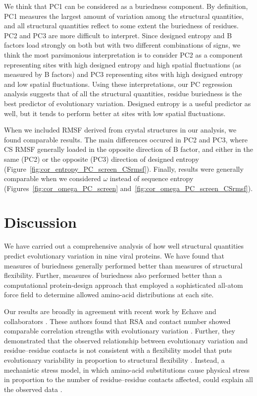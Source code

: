 \documentclass[12pt]{article}
\begin{document}
We think that PC1 can be considered as a buriedness component. By definition, PC1 measures the largest amount of variation among the structural quantities, and all structural quantities reflect to some extent the buriedness of residues. PC2 and PC3 are more difficult to interpret. Since designed entropy and B factors load strongly on both but with two different combinations of signs, we think the most parsimonious interpretation is to consider PC2 as a component representing sites with high designed entropy and high spatial fluctuations (as measured by B factors) and PC3 representing sites with high designed entropy and low spatial fluctuations. Using these interpretations, our PC regression analysis suggests that of all the structural quantities, residue buriedness is the best predictor of evolutionary variation. Designed entropy is a useful predictor as well, but it tends to perform better at sites with low spatial fluctuations.

When we included RMSF derived from crystal structures in our analysis, we found comparable results. The main differences occured in PC2 and PC3, where CS RMSF generally loaded in the opposite direction of B factor, and either in the same (PC2) or the opposite (PC3) direction of designed entropy (Figure~\ref{fig:cor_entropy_PC_screen_CSrmsf}). Finally, results were generally comparable when we considered $\omega$ instead of sequence entropy (Figures~\ref{fig:cor_omega_PC_screen} and~\ref{fig:cor_omega_PC_screen_CSrmsf}).

\section*{Discussion}

We have carried out a comprehensive analysis of how well structural quantities predict evolutionary variation in nine viral proteins. We have found that measures of buriedness generally performed better than measures of structural flexibility. Further, measures of buriedness also performed better than a computational protein-design approach that employed a sophisticated all-atom force field to determine allowed amino-acid distributions at each site. 

Our results are broadly in agreement with recent work by Echave and collaborators \citep{Yehetal2014,Huangetal2014}. These authors found that RSA and contact number showed comparable correlation strengths with evolutionary variation \citep{Yehetal2014}. Further, they demonstrated that the observed relationship between evolutionary variation and residue--residue contacts is not consistent with a flexibility model that puts evolutionary variability in proportion to structural flexibility \citep{Huangetal2014}. Instead, a mechanistic stress model, in which amino-acid substitutions cause physical stress in proportion to the number of residue--residue contacts affected, could explain all the observed data \citep{Huangetal2014}.
\end{document}
